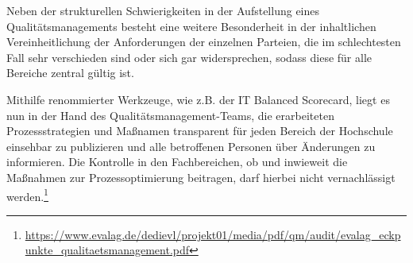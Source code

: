Neben der strukturellen Schwierigkeiten in der Aufstellung eines Qualitätsmanagements besteht eine weitere Besonderheit in der inhaltlichen Vereinheitlichung der Anforderungen der einzelnen Parteien, die im schlechtesten Fall sehr verschieden sind oder sich gar widersprechen, sodass diese für alle Bereiche zentral gültig ist. 

Mithilfe renommierter Werkzeuge, wie z.B. der IT Balanced Scorecard, liegt es nun in der Hand des Qualitätsmanagement-Teams, die erarbeiteten Prozessstrategien und Maßnamen transparent für jeden Bereich der Hochschule einsehbar zu publizieren und alle betroffenen Personen über Änderungen zu informieren. Die Kontrolle in den Fachbereichen, ob und inwieweit die Maßnahmen zur Prozessoptimierung beitragen, darf hierbei nicht vernachlässigt werden.\footnote{\url{https://www.evalag.de/dedievl/projekt01/media/pdf/qm/audit/evalag_eckpunkte_qualitaetsmanagement.pdf}}

